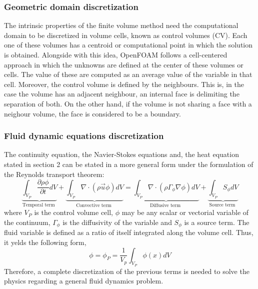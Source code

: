 \subsubsection*{Geometric domain discretization}
The intrinsic properties of the finite volume method need the computational domain to be discretized in volume cells, known as control volumes (CV). Each one of these volumes has a centroid or computational point in which the solution is obtained. 
Alongside with this idea, OpenFOAM follows a cell-centered approach in which the unknowns are defined at the center of these volumes or cells. The value of these are computed as an average value of the variable in that cell.
\newline
Moreover, the control volume is defined by the neighbours. This is, in the case the volume has an adjacent neighbour, an internal face is delimiting the separation of both. On the other hand, if the volume is not sharing a face with a neighour volume, the face is considered to be a boundary.

\subsubsection*{Fluid dynamic equations discretization}
The continuity equation, the Navier-Stokes equations and, the heat equation stated in section 2 can be stated in a more general form under the formulation of the Reynolds transport theorem:
\begin{equation}
\underbrace{\int_{V_{P}} \frac{\partial \rho \phi}{\partial t} d V}_{\text {Temporal term }}+\underbrace{\int_{V_{P}} \nabla \cdot(\rho \vec{u} \phi) d V}_{\text {Convective term }}=\underbrace{\int_{V_{P}} \nabla \cdot\left(\rho \Gamma_{\phi} \nabla \phi\right) d V}_{\text {Diffusive term }}+\underbrace{\int_{V_{P}} S_{\phi} d V}_{\text {Source term }}
\label{3.1}
\end{equation}
where $V_{P}$ is the control volume cell, $\phi$ may be any scalar or vectorial variable of the continuum, $\Gamma_{\phi}$ is the diffusivity of the variable and $S_{\phi}$ is a source term. 
\newline
The fluid variable is defined as a ratio of itself integrated along the volume cell. Thus, it yelds the following form,
\begin{equation}
\phi=\phi_{P}=\frac{1}{V_{p}} \int_{V_{P}} \phi(x) d V
\label{3.2}
\end{equation}
Therefore, a complete discretization of the previous terms is needed to solve the physics regarding a general fluid dynamics problem.
